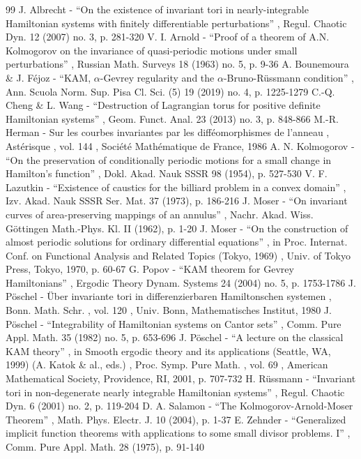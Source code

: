 \documentclass[11pt]{article}
\numberwithin{equation}{section}
\theoremstyle{plain}
\theoremstyle{definition}
\begin{document}
\begin{thebibliography}{99}
 J. Albrecht - “On the existence of invariant tori in nearly-integrable Hamiltonian systems with finitely differentiable perturbations” , Regul. Chaotic Dyn. 12 (2007) no. 3, p. 281-320
 V. I. Arnold - “Proof of a theorem of A.N. Kolmogorov on the invariance of quasi-periodic motions under small perturbations” , Russian Math. Surveys 18 (1963) no. 5, p. 9-36
 A. Bounemoura \& J. Féjoz - “KAM, $\alpha $-Gevrey regularity and the $\alpha $-Bruno-Rüssmann condition” , Ann. Scuola Norm. Sup. Pisa Cl. Sci. (5) 19 (2019) no. 4, p. 1225-1279
 C.-Q. Cheng \& L. Wang - “Destruction of Lagrangian torus for positive definite Hamiltonian systems” , Geom. Funct. Anal. 23 (2013) no. 3, p. 848-866
 M.-R. Herman - Sur les courbes invariantes par les difféomorphismes de l’anneau , Astérisque , vol. 144 , Société Mathématique de France, 1986
 A. N. Kolmogorov - “On the preservation of conditionally periodic motions for a small change in Hamilton’s function” , Dokl. Akad. Nauk SSSR 98 (1954), p. 527-530
 V. F. Lazutkin - “Existence of caustics for the billiard problem in a convex domain” , Izv. Akad. Nauk SSSR Ser. Mat. 37 (1973), p. 186-216
 J. Moser - “On invariant curves of area-preserving mappings of an annulus” , Nachr. Akad. Wiss. Göttingen Math.-Phys. Kl. II (1962), p. 1-20
 J. Moser - “On the construction of almost periodic solutions for ordinary differential equations” , in Proc. Internat. Conf. on Functional Analysis and Related Topics (Tokyo, 1969) , Univ. of Tokyo Press, Tokyo, 1970, p. 60-67
 G. Popov - “KAM theorem for Gevrey Hamiltonians” , Ergodic Theory Dynam. Systems 24 (2004) no. 5, p. 1753-1786
 J. Pöschel - Über invariante tori in differenzierbaren Hamiltonschen systemen , Bonn. Math. Schr. , vol. 120 , Univ. Bonn, Mathematisches Institut, 1980
 J. Pöschel - “Integrability of Hamiltonian systems on Cantor sets” , Comm. Pure Appl. Math. 35 (1982) no. 5, p. 653-696
 J. Pöschel - “A lecture on the classical KAM theory” , in Smooth ergodic theory and its applications (Seattle, WA, 1999) (A. Katok \& al., eds.) , Proc. Symp. Pure Math. , vol. 69 , American Mathematical Society, Providence, RI, 2001, p. 707-732
 H. Rüssmann - “Invariant tori in non-degenerate nearly integrable Hamiltonian systems” , Regul. Chaotic Dyn. 6 (2001) no. 2, p. 119-204
 D. A. Salamon - “The Kolmogorov-Arnold-Moser Theorem” , Math. Phys. Electr. J. 10 (2004), p. 1-37
 E. Zehnder - “Generalized implicit function theorems with applications to some small divisor problems. I” , Comm. Pure Appl. Math. 28 (1975), p. 91-140
\end{thebibliography}
\end{document}

